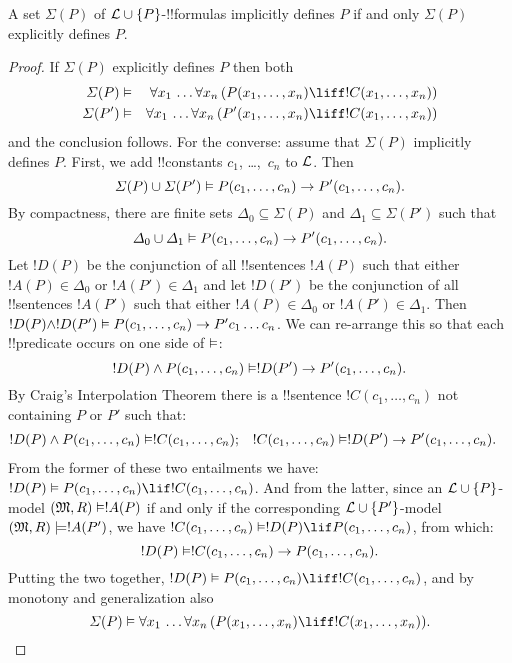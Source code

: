 \documentclass[../../../include/open-logic-section]{subfiles}
\begin{document}
\begin{thm} A set $\Sigma(P)$ of $\mathcal L
  \cup\{P\}$-!!{formula}s implicitly defines $P$ if and only $\Sigma(P)$
  explicitly defines $P$.
\end{thm}

\begin{proof}
If $\Sigma(P)$ explicitly defines $P$ then both
\begin{align*}
  \Sigma(P) & \Entails & \lforall[x_1][\dots \lforall[x_n]
    [(\Atom{P}{x_1,\dots, x_n} \liff !C(x_1,\dots,x_n))]]\\
  \Sigma(P') & \Entails & \lforall[x_1][\dots \lforall[x_n]
    [(\Atom{P'}{x_1,\dots, x_n} \liff !C(x_1,\dots,x_n))]]
\end{align*}
and the conclusion follows. For the converse: assume that $\Sigma(P)$
implicitly defines $P$. First, we add !!{constant}s $c_1$, \dots,~$c_n$ to
$\mathcal L$. Then
\[
\Sigma(P) \cup \Sigma(P') \Entails
\Atom{P}{c_1, \dots, c_n} \to  \Atom{P'}{c_1, \dots, c_n}.
\]
By compactness, there are finite sets $\Delta_0 \subseteq \Sigma(P)$
and $\Delta_1 \subseteq \Sigma(P')$ such that
\[
\Delta_0 \cup \Delta_1 \Entails
\Atom{P}{c_1, \dots, c_n} \to \Atom{P'}{c_1, \dots, c_n}.
\]
Let $!D(P)$ be the conjunction of all !!{sentence}s $!A(P)$ such that
either $!A(P) \in \Delta_0$ or $!A(P') \in \Delta_1$ and let $!D(P')$
be the conjunction of all !!{sentence}s $!A(P')$ such that either
$!A(P) \in \Delta_0$ or $!A(P') \in \Delta_1$. Then $!D(P) \land
!D(P') \Entails \Atom{P}{c_1, \dots, c_n} \to P'c_1\dots c_n$. We can
re-arrange this so that each !!{predicate} occurs on one side of
$\Entails$:
\[
!D(P) \land \Atom{P}{c_1, \dots, c_n} \Entails
!D(P') \to \Atom{P'}{c_1, \dots, c_n}.
\]
By Craig's Interpolation Theorem there is a !!{sentence} $!C(c_1,\dots, c_n)$
not containing $P$ or $P'$ such that:
\begin{align*}
  !D(P) \land \Atom{P}{c_1, \dots, c_n} & \Entails !C(c_1,\dots, c_n); &
  !C(c_1,\dots, c_n) & \Entails !D(P') \to \Atom{P'}{c_1, \dots, c_n}.
\end{align*}
From the former of these two entailments we have: $!D(P) \Entails
\Atom{P}{c_1,\dots, c_n} \lif !C(c_1,\dots, c_n)$. And from the
latter, since an $\mathcal L \cup \{P\}$-model $\Expan{M}{R}
\Entails !A(P)$ if and only if the corresponding $\mathcal L \cup
\{P'\}$-model $(\mathfrak M, R) \models !A(P')$, we have
$!C(c_1,\dots, c_n) \Entails !D(P) \lif \Atom{P}{c_1,\dots, c_n}$,
from which:
\[
!D(P) \Entails !C(c_1,\dots,c_n) \to \Atom{P}{c_1,\dots, c_n}.
\]
Putting the two together, $!D(P) \Entails \Atom{P}{c_1,\dots, c_n}
\liff !C(c_1, \dots, c_n)$, and by monotony and generalization also
\[
\Sigma(P) \Entails
\lforall[x_1][\dots\lforall[x_n][(\Atom{P}{x_1,\dots, x_n} \liff
    !C(x_1,\dots, x_n))]].\qedhere
\]
\end{proof}
\end{document}
